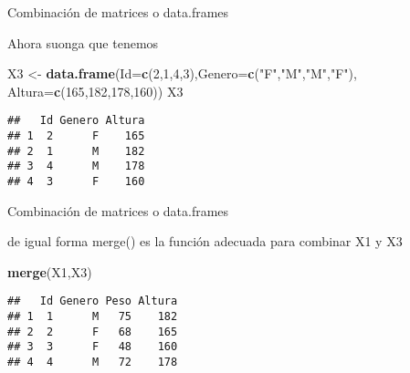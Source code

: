 \documentclass[ignorenonframetext,]{beamer}
\newenvironment{Shaded}{\begin{snugshade}}{\end{snugshade}}
\newcommand{\KeywordTok}[1]{\textcolor[rgb]{0.13,0.29,0.53}{\textbf{#1}}}
\newcommand{\DataTypeTok}[1]{\textcolor[rgb]{0.13,0.29,0.53}{#1}}
\newcommand{\DecValTok}[1]{\textcolor[rgb]{0.00,0.00,0.81}{#1}}
\newcommand{\StringTok}[1]{\textcolor[rgb]{0.31,0.60,0.02}{#1}}
\newcommand{\NormalTok}[1]{#1}
\begin{document}
\begin{frame}[fragile]{Combinación de matrices o data.frames}

Ahora suonga que tenemos

\begin{Shaded}
\begin{Highlighting}[]
\NormalTok{X3 <-}\StringTok{ }\KeywordTok{data.frame}\NormalTok{(}\DataTypeTok{Id=}\KeywordTok{c}\NormalTok{(}\DecValTok{2}\NormalTok{,}\DecValTok{1}\NormalTok{,}\DecValTok{4}\NormalTok{,}\DecValTok{3}\NormalTok{),}\DataTypeTok{Genero=}\KeywordTok{c}\NormalTok{(}\StringTok{"F"}\NormalTok{,}\StringTok{"M"}\NormalTok{,}\StringTok{"M"}\NormalTok{,}\StringTok{"F"}\NormalTok{),}
                 \DataTypeTok{Altura=}\KeywordTok{c}\NormalTok{(}\DecValTok{165}\NormalTok{,}\DecValTok{182}\NormalTok{,}\DecValTok{178}\NormalTok{,}\DecValTok{160}\NormalTok{))}
\NormalTok{X3}
\end{Highlighting}
\end{Shaded}

\begin{verbatim}
##   Id Genero Altura
## 1  2      F    165
## 2  1      M    182
## 3  4      M    178
## 4  3      F    160
\end{verbatim}

\end{frame}

\begin{frame}[fragile]{Combinación de matrices o data.frames}

de igual forma merge() es la función adecuada para combinar X1 y X3

\begin{Shaded}
\begin{Highlighting}[]
\KeywordTok{merge}\NormalTok{(X1,X3)}
\end{Highlighting}
\end{Shaded}

\begin{verbatim}
##   Id Genero Peso Altura
## 1  1      M   75    182
## 2  2      F   68    165
## 3  3      F   48    160
## 4  4      M   72    178
\end{verbatim}

\end{frame}
\end{document}
